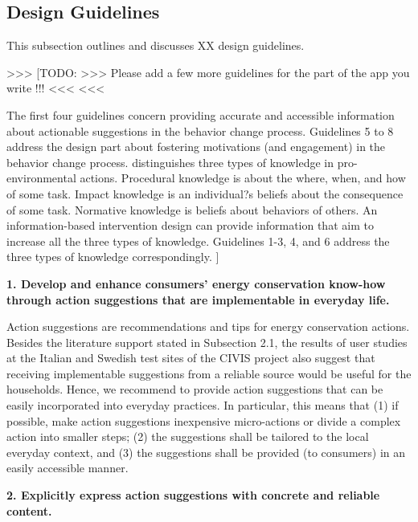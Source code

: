 \subsection{Design Guidelines} 


This subsection outlines and discusses XX design guidelines. 

>>>
[TODO: >>> Please add a few more guidelines for the part of the app you write !!! <<<
<<<

The first four guidelines concern providing accurate and accessible information about actionable suggestions in the behavior change process. Guidelines 5 to 8 address the design part about fostering motivations (and engagement) in the behavior change process. \citet{Schultz2002} distinguishes three types of knowledge in pro-environmental actions. Procedural knowledge is about the where, when, and how of some task. Impact knowledge is an individual?s beliefs about the consequence of some task. Normative knowledge is beliefs about behaviors of others. An information-based intervention design can provide information that aim to increase all the three types of knowledge. Guidelines 1-3, 4, and 6 address the three types of knowledge correspondingly. ]

\vspace{.3cm}
\noindent\textbf{1. Develop and enhance consumers' energy conservation know-how through action suggestions that are implementable in everyday life.}

Action suggestions are recommendations and tips for energy conservation actions. Besides the literature support stated in Subsection 2.1, the results of user studies at the Italian and Swedish test sites of the CIVIS project also suggest that receiving implementable suggestions from a reliable source would be useful for the households. Hence, we recommend to provide action suggestions that can be easily incorporated into everyday practices. In particular, this means that (1) if possible, make action suggestions inexpensive micro-actions or divide a complex action into smaller steps; (2) the suggestions shall be tailored to the local everyday context, and (3) the suggestions shall be provided (to consumers) in an easily accessible manner. 

\vspace{.3cm}
\noindent\textbf{2. Explicitly express action suggestions with concrete and reliable content.}

